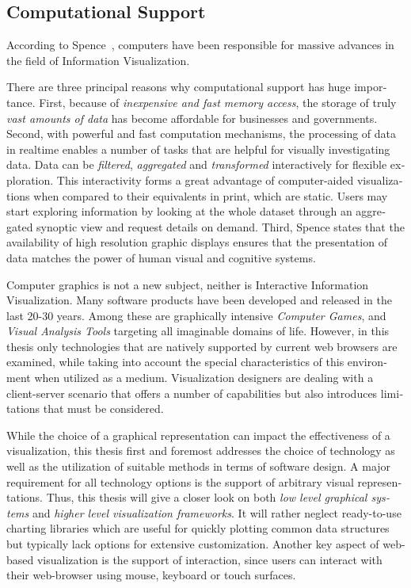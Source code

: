 \begin{english}

\section{Computational Support}

According to Spence~\cite{InformationVisualization07}, computers have been responsible for massive advances in the field of Information Visualization.

There are three principal reasons why computational support has huge importance. First, because of \emph{inexpensive and fast memory access}, the storage of truly \emph{vast amounts of data} has become affordable for businesses and governments. Second, with powerful and fast computation mechanisms, the processing of data in realtime enables a number of tasks that are helpful for visually investigating data. Data can be \emph{filtered}, \emph{aggregated} and \emph{transformed} interactively for flexible exploration. This interactivity forms a great advantage of computer-aided visualizations when compared to their equivalents in print, which are static. Users may start exploring information by looking at the whole dataset through an aggregated synoptic view and request details on demand. Third, Spence states that the availability of high resolution graphic displays ensures that the presentation of data matches the power of human visual and cognitive systems. 

Computer graphics is not a new subject, neither is Interactive Information Visualization. Many software products have been developed and released in the last 20-30 years. Among these are graphically intensive \emph{Computer Games}, and \emph{Visual Analysis Tools} targeting all imaginable domains of life. However, in this thesis only technologies that are natively supported by current web browsers are examined, while taking into account the special characteristics of this environment when utilized as a medium. Visualization designers are dealing with a client-server scenario that offers a number of capabilities but also introduces limitations that must be considered.

While the choice of a graphical representation can impact the effectiveness of a visualization, this thesis first and foremost addresses the choice of technology as well as the utilization of suitable methods in terms of software design. A major requirement for all technology options is the support of arbitrary visual representations. Thus, this thesis will give a closer look on both \emph{low level graphical systems} and \emph{higher level visualization frameworks}. It will rather neglect ready-to-use charting libraries which are useful for quickly plotting common data structures but typically lack options for extensive customization. Another key aspect of web-based visualization is the support of interaction, since users can interact with their web-browser using mouse, keyboard or touch surfaces.



\end{english}
